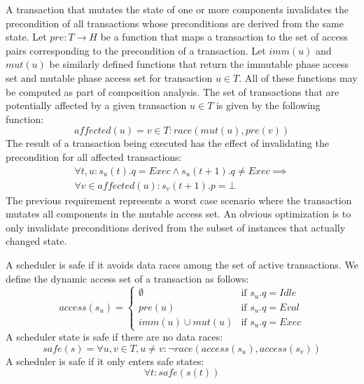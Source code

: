 A transaction that mutates the state of one or more components invalidates the precondition of all transactions whose preconditions are derived from the same state.
Let $\mathit{pre}: T \to H$ be a function that maps a transaction to the set of access pairs corresponding to the precondition of a transaction.
Let $\mathit{imm}(u)$ and $\mathit{mut}(u)$ be similarly defined functions that return the immutable phase access set and mutable phase access set for transaction $u \in T$.
All of these functions may be computed as part of composition analysis.
The set of transactions that are potentially affected by a given transaction $u \in T$ is given by the following function:
\begin{equation}
  \label{affected}
  \mathit{affected}(u) = { v \in T : \mathit{race}(\mathit{mut}(u), \mathit{pre}(v)) }
\end{equation}
The result of a transaction being executed has the effect of invalidating the precondition for all affected transactions:
\begin{multline}
  \forall t, u : s_u(t).q = \mathit{Exec} \land s_u(t+1).q \neq \mathit{Exec} \implies \\ \forall v \in \mathit{affected}(u) : s_v(t+1).p = \bot
\end{multline}
The previous requirement represents a worst case scenario where the transaction mutates all components in the mutable access set.
An obvious optimization is to only invalidate preconditions derived from the subset of instances that actually changed state.

A scheduler is safe if it avoids data races among the set of active transactions.
We define the dynamic access set of a transaction as follows:
\begin{equation}
  \label{access}
  \mathit{access}(s_u) = \begin{cases}
    \emptyset & \text{if $s_u.q = \mathit{Idle}$} \\
    \mathit{pre}(u) & \text{if $s_u.q = \mathit{Eval}$} \\
    \mathit{imm}(u) \cup \mathit{mut}(u) & \text{if $s_u.q = \mathit{Exec}$}
    \end{cases}
\end{equation}
A scheduler state is safe if there are no data races:
\begin{equation}
  \mathit{safe}(s) = \forall u, v \in T, u \neq v : \lnot \mathit{race} (\mathit{access}(s_u), \mathit{access}(s_v))
\end{equation}
A scheduler is safe if it only enters safe states:
\begin{equation}
  \label{race}
  \forall t : \mathit{safe}(s(t))
\end{equation}

